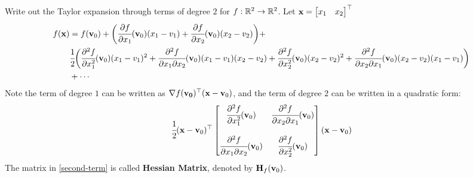     \begin{Ex}
        Write out the Taylor expansion through terms of degree $2$ for $f:\mathbb{R}^2 \to \mathbb{R}^2$. Let $\mathbf{x} = \begin{bmatrix}
            x_1 & x_2
        \end{bmatrix}^\top$
        \begin{align*}
            f(\mathbf{x}) &= f(\mathbf{v}_0) + \bigg(\cfrac{\partial f}{\partial x_1}(\mathbf{v}_0)(x_1 - v_1) + \cfrac{\partial f}{\partial x_2}(\mathbf{v}_0)(x_2 - v_2) \bigg) + \\
            & \cfrac{1}{2}\bigg(\cfrac{\partial^2 f}{\partial x_1^2}(\mathbf{v}_0)(x_1 - v_1)^2 + \cfrac{\partial^2 f}{\partial x_1 \partial x_2}(\mathbf{v}_0)(x_1 - v_1)(x_2 - v_2) + \cfrac{\partial^2 f}{\partial x_2^2}(\mathbf{v}_0)(x_2 - v_2)^2 +  \cfrac{\partial^2 f}{\partial x_2 \partial x_1}(\mathbf{v}_0)(x_2 - v_2)(x_1 - v_1)   \bigg)\\
            & + \cdots 
        \end{align*}
        Note the term of degree $1$ can be written as $\nabla f(\mathbf{v_0})^{\top} (\mathbf{x} - \mathbf{v}_0)$, and the term of degree $2$ can be written in a quadratic form:
        \begin{equation}\label{second-term}
            \cfrac{1}{2}(\mathbf{x} - \mathbf{v}_0)^{\top} \begin{bmatrix}
            \cfrac{\partial^2 f}{\partial x_1^2}(\mathbf{v}_0) & \cfrac{\partial^2 f}{\partial x_2 \partial x_1}(\mathbf{v}_0)\\\\
            \cfrac{\partial^2 f}{\partial x_1 \partial x_2}(\mathbf{v}_0) & \cfrac{\partial^2 f}{\partial x_2^2}(\mathbf{v}_0) 
        \end{bmatrix} (\mathbf{x} - \mathbf{v}_0)
        \end{equation} The matrix in \cref{second-term} is called \textbf{Hessian Matrix}, denoted by $\mathbf{H}_f(\mathbf{v}_0)$.
    \end{Ex}

